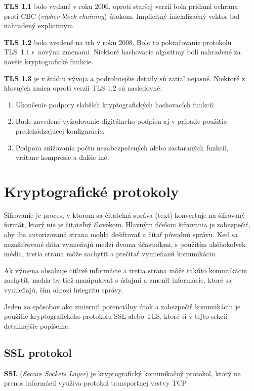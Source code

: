 \textbf{TLS 1.1} bolo vydané v roku 2006, oproti staršej verzií bola pridaná ochrana proti CBC (\emph{cipher-block chaining}) útokom. Implicitný inicializačný vektor bol nahradený explicitným.

\textbf{TLS 1.2} bolo uvedené na trh v roku 2008. Bolo to pokračovanie protokolu TLS~1.1 s~novými zmenami. Niektoré hashovacie algoritmy boli nahradené za novšie kryptografické funkcie.

\textbf{TLS 1.3} je v štádiu vývoja a podrobnejšie detaily sú zatiaľ nejasné. Niektoré z hlavných zmien oproti verzii TLS 1.2 sú nasledovné:
\begin{enumerate}

\item Ukončenie podpory slabších kryptografických hashovacích funkcií.

\item Bude zavedené vyžadovanie digitálneho podpisu aj v prípade použitia pred\-chá\-dza\-jú\-cej konfigurácie.

\item Podpora znižovania počtu nezabezpečených alebo zastaraných funkcií, vrátane kompresie a ďalšie iné. \cite{tls-ssl-history}

\end{enumerate}

\section{Kryptografické protokoly}
Šifrovanie je proces, v ktorom sa čitateľná správa (text) konvertuje na šifrovaný formát, ktorý nie je čitateľný človekom. Hlavným účelom šifrovania je zabezpečiť, aby iba autorizovaná strana mohla dešifrovať a čítať pôvodnú správu. Keď sa nezašifrované dáta vymieňajú medzi dvoma účastníkmi, s použitím akéhokoľvek média, tretia strana môže zachytiť a prečítať vymieňanú komunikáciu.

Ak výmena obsahuje citlivé informácie a tretia strana môže takúto komunikáciu zachytiť, mohla by tiež manipulovať s údajmi a zmeniť informácie, ktoré sa vymieňajú, čím ohrozí integritu správy.
	
Jeden zo spôsobov ako zmierniť potenciálny útok a zabezpečiť komunikáciu je použitie  kryptografického protokolu SSL alebo TLS, ktoré si v tejto sekcií detailnejšie popíšeme. 

\subsection{SSL protokol}
\textbf{SSL} (\emph{Secure Sockets Layer}) je kryptografický komunikačný protokol, ktorý na prenos informácií využíva protokol transportnej vrstvy TCP.

